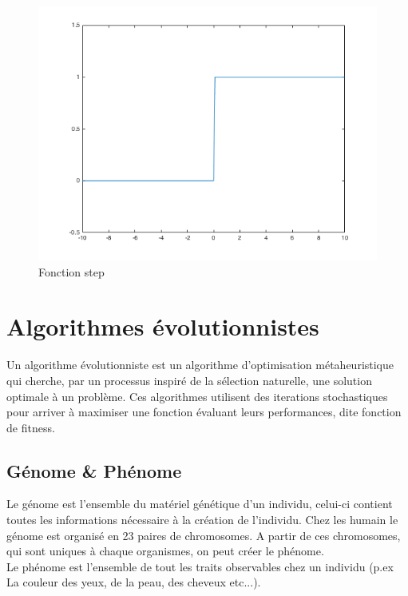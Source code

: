 \documentclass{article}
\begin{document}
\begin{figure}[h]
\begin{center}
	\includegraphics[scale=0.4]{step.png} 
	\caption{Fonction step}
\end{center}
\end{figure}

\newpage
\section{Algorithmes évolutionnistes}

Un algorithme évolutionniste est un algorithme d'optimisation métaheuristique qui cherche, par un processus inspiré de la sélection naturelle, une solution optimale à un problème. Ces algorithmes utilisent des iterations stochastiques pour arriver à maximiser une fonction évaluant leurs performances, dite fonction de fitness.\cite{wikiea}\\

\subsection{Génome \& Phénome}

Le génome est l'ensemble du matériel génétique d'un individu, celui-ci contient toutes les informations nécessaire à la création de l'individu.\cite{wikigenome} Chez les humain le génome est organisé en 23 paires de chromosomes. A partir de ces chromosomes, qui sont uniques à chaque organismes, on peut créer le phénome.\\
Le phénome est l'ensemble de tout les traits observables chez un individu (p.ex La couleur des yeux, de la peau, des cheveux etc...).\cite{wikiphenome}\\
\end{document}

